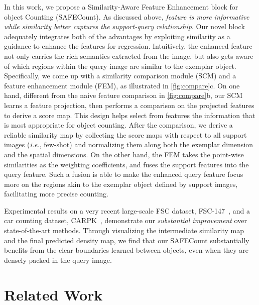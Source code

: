 \documentclass[10pt,twocolumn,letterpaper]{article}
\newcommand{\method}{SAFECount\xspace}
\begin{document}
In this work, we propose a Similarity-Aware Feature Enhancement block for object Counting (\method).
As discussed above, \textit{feature is more informative while similarity better captures the support-query relationship}. 
Our novel block adequately integrates both of the advantages by exploiting similarity as a guidance to enhance the features for regression.
Intuitively, the enhanced feature not only carries the rich semantics extracted from the image, but also gets aware of which regions within the query image are similar to the exemplar object.
Specifically, we come up with a similarity comparison module (SCM) and a feature enhancement module (FEM), as illustrated in \cref{fig:compare}c.
On one hand, different from the naive feature comparison in \cref{fig:compare}b, our SCM learns a feature projection, then performs a comparison on the projected features to derive a score map. 
This design helps select from features the information that is most appropriate for object counting.
After the comparison, we derive a reliable similarity map by collecting the score maps with respect to all support images (\textit{i.e.}, few-shot) and normalizing them along both the exemplar dimension and the spatial dimensions.
On the other hand, the FEM takes the point-wise similarities as the weighting coefficients, and fuses the support features into the query feature.
Such a fusion is able to make the enhanced query feature focus more on the regions akin to the exemplar object defined by support images, facilitating more precise counting.


Experimental results on a very recent large-scale FSC dataset, FSC-147~\cite{famnet}, and a car counting dataset, CARPK~\cite{lpn}, demonstrate our \textit{substantial improvement} over state-of-the-art methods.
Through visualizing the intermediate similarity map and the final predicted density map, we find that our \method substantially benefits from the clear boundaries learned between objects, even when they are densely packed in the query image.
 \section{Related Work}\label{sec:related}
\end{document}
